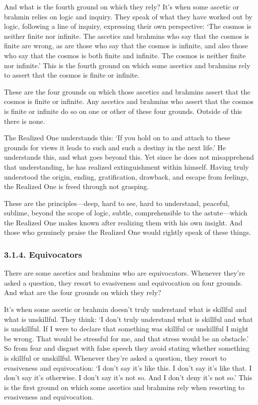 \documentclass[12pt,openany]{book}%
\begin{document}
And what is the fourth ground on which they rely? It’s when some ascetic or brahmin relies on logic and inquiry. They speak of what they have worked out by logic, following a line of inquiry, expressing their own perspective: ‘The cosmos is neither finite nor infinite. The ascetics and brahmins who say that the cosmos is finite are wrong, as are those who say that the cosmos is infinite, and also those who say that the cosmos is both finite and infinite. The cosmos is neither finite nor infinite.’ This is the fourth ground on which some ascetics and brahmins rely to assert that the cosmos is finite or infinite. 

These are the four grounds on which those ascetics and brahmins assert that the cosmos is finite or infinite. Any ascetics and brahmins who assert that the cosmos is finite or infinite do so on one or other of these four grounds. Outside of this there is none. 

The Realized One understands this: ‘If you hold on to and attach to these grounds for views it leads to such and such a destiny in the next life.’ He understands this, and what goes beyond this. Yet since he does not misapprehend that understanding, he has realized extinguishment within himself. Having truly understood the origin, ending, gratification, drawback, and escape from feelings, the Realized One is freed through not grasping. 

These are the principles—deep, hard to see, hard to understand, peaceful, sublime, beyond the scope of logic, subtle, comprehensible to the astute—which the Realized One makes known after realizing them with his own insight. And those who genuinely praise the Realized One would rightly speak of these things. 

\subsubsection*{3.1.4. Equivocators }

There are some ascetics and brahmins who are equivocators. Whenever they’re asked a question, they resort to evasiveness and equivocation on four grounds. And what are the four grounds on which they rely? 

It’s when some ascetic or brahmin doesn’t truly understand what is skillful and what is unskillful. They think: ‘I don’t truly understand what is skillful and what is unskillful. If I were to declare that something was skillful or unskillful I might be wrong. That would be stressful for me, and that stress would be an obstacle.’ So from fear and disgust with false speech they avoid stating whether something is skillful or unskillful. Whenever they’re asked a question, they resort to evasiveness and equivocation: ‘I don’t say it’s like this. I don’t say it’s like that. I don’t say it’s otherwise. I don’t say it’s not so. And I don’t deny it’s not so.’ This is the first ground on which some ascetics and brahmins rely when resorting to evasiveness and equivocation. 
\end{document}
